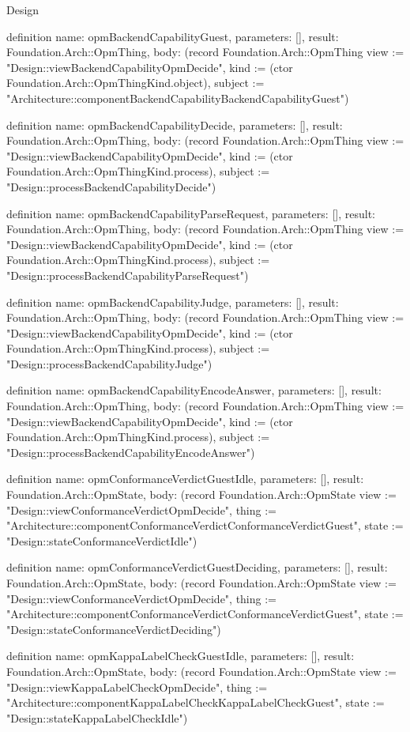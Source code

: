 \begin{lexlean}{Design}
\begin{semanticmodule}
definition{
  name: opmBackendCapabilityGuest,
  parameters: [],
  result: Foundation.Arch::OpmThing,
  body: (record Foundation.Arch::OpmThing {view := "Design::viewBackendCapabilityOpmDecide", kind := (ctor Foundation.Arch::OpmThingKind.object), subject := "Architecture::componentBackendCapabilityBackendCapabilityGuest"})
}

definition{
  name: opmBackendCapabilityDecide,
  parameters: [],
  result: Foundation.Arch::OpmThing,
  body: (record Foundation.Arch::OpmThing {view := "Design::viewBackendCapabilityOpmDecide", kind := (ctor Foundation.Arch::OpmThingKind.process), subject := "Design::processBackendCapabilityDecide"})
}

definition{
  name: opmBackendCapabilityParseRequest,
  parameters: [],
  result: Foundation.Arch::OpmThing,
  body: (record Foundation.Arch::OpmThing {view := "Design::viewBackendCapabilityOpmDecide", kind := (ctor Foundation.Arch::OpmThingKind.process), subject := "Design::processBackendCapabilityParseRequest"})
}

definition{
  name: opmBackendCapabilityJudge,
  parameters: [],
  result: Foundation.Arch::OpmThing,
  body: (record Foundation.Arch::OpmThing {view := "Design::viewBackendCapabilityOpmDecide", kind := (ctor Foundation.Arch::OpmThingKind.process), subject := "Design::processBackendCapabilityJudge"})
}

definition{
  name: opmBackendCapabilityEncodeAnswer,
  parameters: [],
  result: Foundation.Arch::OpmThing,
  body: (record Foundation.Arch::OpmThing {view := "Design::viewBackendCapabilityOpmDecide", kind := (ctor Foundation.Arch::OpmThingKind.process), subject := "Design::processBackendCapabilityEncodeAnswer"})
}

definition{
  name: opmConformanceVerdictGuestIdle,
  parameters: [],
  result: Foundation.Arch::OpmState,
  body: (record Foundation.Arch::OpmState {view := "Design::viewConformanceVerdictOpmDecide", thing := "Architecture::componentConformanceVerdictConformanceVerdictGuest", state := "Design::stateConformanceVerdictIdle"})
}

definition{
  name: opmConformanceVerdictGuestDeciding,
  parameters: [],
  result: Foundation.Arch::OpmState,
  body: (record Foundation.Arch::OpmState {view := "Design::viewConformanceVerdictOpmDecide", thing := "Architecture::componentConformanceVerdictConformanceVerdictGuest", state := "Design::stateConformanceVerdictDeciding"})
}

definition{
  name: opmKappaLabelCheckGuestIdle,
  parameters: [],
  result: Foundation.Arch::OpmState,
  body: (record Foundation.Arch::OpmState {view := "Design::viewKappaLabelCheckOpmDecide", thing := "Architecture::componentKappaLabelCheckKappaLabelCheckGuest", state := "Design::stateKappaLabelCheckIdle"})
}


\end{semanticmodule}
\end{lexlean}
